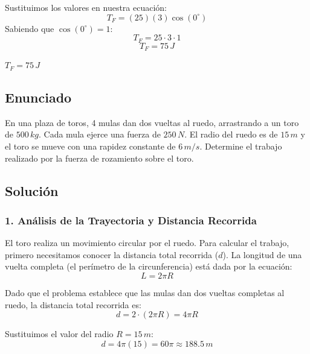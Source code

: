 \documentclass[12pt, a4paper]{article}
\begin{document}
Sustituimos los valores en nuestra ecuación:
$$ T_F = (25)(3) \cos(0^\circ) $$
Sabiendo que $\cos(0^\circ) = 1$:
$$ T_F = 25 \cdot 3 \cdot 1 $$
$$ T_F = 75 \, \si{J} $$

\begin{tcolorbox}[colback=green!5!white, colframe=green!50!black, title=Respuesta Final]
\centering \Large $T_F = 75 \, \si{J}$
\end{tcolorbox}

\newpage

\subsection*{Enunciado}
En una plaza de toros, 4 mulas dan dos vueltas al ruedo, arrastrando a un toro de $500 \, \si{kg}$. Cada mula ejerce una fuerza de $250 \, \si{N}$. El radio del ruedo es de $15 \, \si{m}$ y el toro se mueve con una rapidez constante de $6 \, \si{m/s}$. Determine el trabajo realizado por la fuerza de rozamiento sobre el toro.

\begin{center}
\end{center}

\subsection*{Solución}

\subsubsection*{1. Análisis de la Trayectoria y Distancia Recorrida}
El toro realiza un movimiento circular por el ruedo. Para calcular el trabajo, primero necesitamos conocer la distancia total recorrida ($d$). La longitud de una vuelta completa (el perímetro de la circunferencia) está dada por la ecuación:
$$L = 2\pi R$$

Dado que el problema establece que las mulas dan dos vueltas completas al ruedo, la distancia total recorrida es:
$$d = 2 \cdot (2\pi R) = 4\pi R$$

Sustituimos el valor del radio $R = 15 \, \si{m}$:
$$d = 4\pi (15) = 60\pi \approx 188.5 \, \si{m}$$
\end{document}
